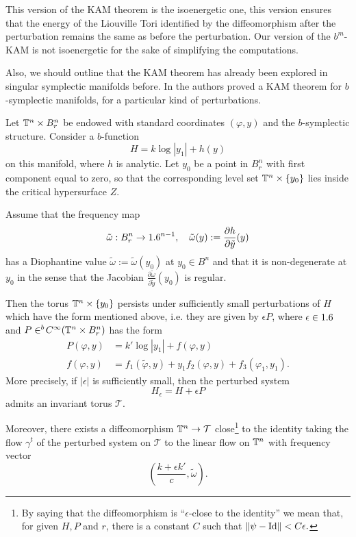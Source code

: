 \begin{theorem}
\begin{enumerate}
\end{enumerate}

\end{theorem}

\begin{remark}
This version of the KAM theorem is the isoenergetic one, this version ensures that the energy of the Liouville Tori identified by the diffeomorphism after the perturbation remains the same as before the perturbation. Our version of the $b^m$-KAM is not isoenergetic for the sake of simplifying the computations.
\end{remark}

Also, we should outline that the KAM theorem has already been explored in singular symplectic manifolds before. In \cite{KMS16} the authors proved a KAM theorem for $b$-symplectic manifolds, for a particular kind of perturbations.

\begin{theorem}

Let $\mathbb{T}^n \times B_r^n$ be endowed with standard coordinates $(\varphi,y)$ and the $b$-symplectic structure. Consider a $b$-function
$$H = k \log|y_1| + h(y)$$
 on this manifold, where $h$ is analytic. Let $y_0$ be a point in $B_r^n$ with first component equal to zero, so that the corresponding level set $\mathbb{T}^n \times \{y_0\}$ lies inside the critical hypersurface $Z$.

Assume that the frequency map
$$\tilde \omega: B^n_r \to 1.6^{n-1}, \quad \tilde \omega( y):= \frac{\partial h}{\partial \tilde y}(y)$$
 has a Diophantine value $\tilde \omega := \tilde \omega(y_0)$ at $y_0 \in B^n$ and that it is non-degenerate at $y_0$ in the sense that the Jacobian $ \frac{\partial \tilde \omega}{\partial \tilde y} (y_0) $ is regular.

Then the torus $\mathbb{T}^n \times \{ {y_0}\}$  persists under sufficiently small perturbations of $H$ which have the form mentioned above, i.e. they are given by $\epsilon P$, where $\epsilon \in 1.6$ and $P \in ^b \! C^\infty(\mathbb{T}^n \times B_r^n)$ has the form
\begin{align*}
 P(\varphi, y) &= k' \log |y_1| + f(\varphi,y) \\
 f(\varphi, y) &= f_1(\tilde \varphi, y ) + y_1 f_2(\varphi, y) + f_3(\varphi_1,y_1).
\end{align*}
More precisely, if $|\epsilon|$ is sufficiently small, then the  perturbed system
  $$ H_\epsilon =H + \epsilon P$$
admits an invariant torus $\mathcal{T}$.%

Moreover, there exists a diffeomorphism $\mathbb{T}^n \to \mathcal{T}$ close\footnote{By saying that the diffeomorphism is ``$\epsilon$-close to the identity'' we mean that, for given $H, P$ and $r$, there is a constant $C$ such that $\|\psi - \text{Id}\| < C \epsilon.$} to the identity taking the flow $\gamma^t$  of the perturbed system on $\mathcal{T}$ to the linear flow  on $\mathbb{T}^n$ with frequency vector
$$ \left(\frac{k+\epsilon k'}{c}, \tilde \omega \right).$$
\end{theorem}


